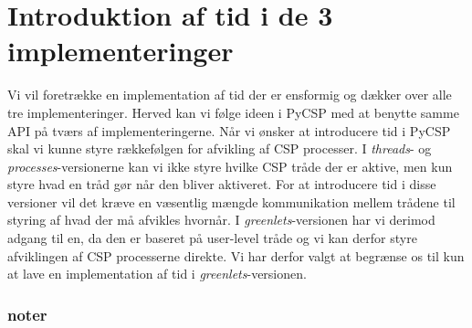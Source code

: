 \section{Introduktion af tid i de 3 implementeringer}
Vi vil foretrække en implementation af tid der er ensformig og dækker over alle tre implementeringer. Herved kan vi følge ideen i PyCSP med at benytte samme API på tværs af implementeringerne. Når vi ønsker at introducere tid i PyCSP skal vi kunne styre rækkefølgen for afvikling af CSP processer. I  \emph{threads}- og \emph{processes}-versionerne kan vi ikke styre hvilke CSP tråde der er aktive, men kun styre hvad en tråd gør når den bliver aktiveret. For at introducere tid i disse versioner vil det kræve en væsentlig mængde kommunikation mellem trådene til styring af hvad der må afvikles hvornår. I \emph{greenlets}-versionen har vi derimod adgang til \sched en, da den er baseret på user-level tråde og vi kan derfor styre afviklingen af CSP processerne direkte. Vi har derfor valgt at begrænse os til kun at lave en implementation af tid i \emph{greenlets}-versionen. 

\subsubsection{noter}





